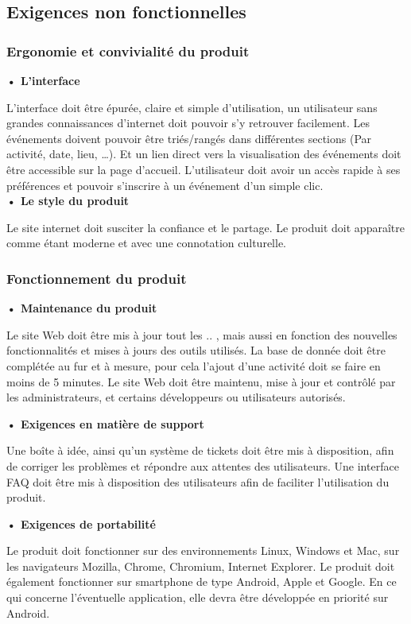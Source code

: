 \subsection{Exigences non fonctionnelles}

\subsubsection{Ergonomie et convivialité du produit}

\textbf{• L’interface}

L’interface doit être épurée, claire et simple d’utilisation, un utilisateur sans grandes connaissances d’internet doit pouvoir s’y retrouver facilement. Les événements doivent pouvoir être triés/rangés dans différentes sections (Par activité, date, lieu, …). Et un lien direct vers la visualisation des événements doit être accessible sur la page d’accueil.
L’utilisateur doit avoir un accès rapide à ses préférences et pouvoir s’inscrire à un événement d’un simple clic. \\

\textbf{• Le style du produit}

Le site internet doit susciter la confiance et le partage. Le produit doit apparaître comme étant moderne et avec une connotation culturelle.

\subsubsection{Fonctionnement du produit}

\textbf{• Maintenance du produit}

Le site Web doit être mis à jour tout les .. , mais aussi en fonction des nouvelles fonctionnalités et mises à jours des outils utilisés. 
La base de donnée doit être complétée au fur et à mesure, pour cela l’ajout d’une activité doit se faire en moins de 5 minutes. 
Le site Web doit être maintenu, mise à jour et contrôlé par les administrateurs, et certains développeurs ou utilisateurs autorisés.

\textbf{• Exigences en matière de support}

Une boîte à idée, ainsi qu’un système de tickets doit être mis à disposition, afin de corriger les problèmes et répondre aux attentes des utilisateurs.
Une interface FAQ doit être mis à disposition des utilisateurs afin de faciliter l’utilisation du produit.

\textbf{• Exigences de portabilité}

Le produit doit fonctionner sur des environnements Linux, Windows et Mac, sur les navigateurs Mozilla, Chrome, Chromium, Internet Explorer. Le produit doit également fonctionner sur smartphone de type Android, Apple et Google. En ce qui concerne l’éventuelle application, elle devra être développée en priorité sur Android.

